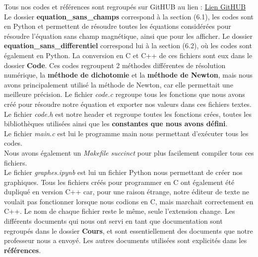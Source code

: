 \documentclass[10pt,a4paper]{article}
\begin{document}
Tous nos codes  et références sont regroupés sur GitHUB au lien : \href{https://github.com/Yamacia/Ferrofluide/tree/master}{Lien GitHUB}
\newline
Le dossier \textbf{equation\_sans\_champs} correspond à la section (6.1), les codes sont en Python et permettent de résoudre toutes les équations considérées pour résoudre l'équation sans champ magnétique, ainsi que pour les afficher.
\newline
Le dossier \textbf{equation\_sans\_differentiel} correspond lui à la section (6.2), où les codes sont également en Python. La conversion en C et C++ de ces fichiers sont eux dans le dossier \textbf{Code}. Ces codes regroupent 2 méthodes différentes de résolution numérique, la \textbf{méthode de dichotomie} et la \textbf{méthode de Newton}, mais nous avons principalement utilisé la méthode de Newton, car elle permettait une meilleure précision.
\newline
Le fichier \textit{code.c} regroupe tous les fonctions que nous avons créé pour résoudre notre équation et exporter nos valeurs dans ces fichiers textes.\\
Le fichier \textit{code.h} est notre header et regroupe toutes les fonctions crées, toutes les bibliothèques utilisées ainsi que les \textbf{constantes que nous avons défini}. \\
Le fichier \textit{main.c} est lui le programme main nous permettant d'exécuter tous les codes. \\
Nous avons également un \textit{Makefile succinct} pour plus facilement compiler tous ces fichiers. \\
Le fichier \textit{graphes.ipynb} est lui un fichier Python nous permettant de créer nos graphiques.
\newline
Tous les fichiers créés pour programmer en C ont également été dupliqué en version C++ car, pour une raison étrange, notre éditeur de texte ne voulait pas fonctionner lorsque nous codions en C, mais marchait correctement en C++. Le nom de chaque fichier reste le même, seule l'extension change.
\newline
Les différents documents qui nous ont servi en tant que documentation sont regroupés dans le dossier \textbf{Cours}, et sont essentiellement des documents que notre professeur nous a envoyé. Les autres documents utilisées sont explicités dans les \textbf{références}.
\newpage


\end{document}
